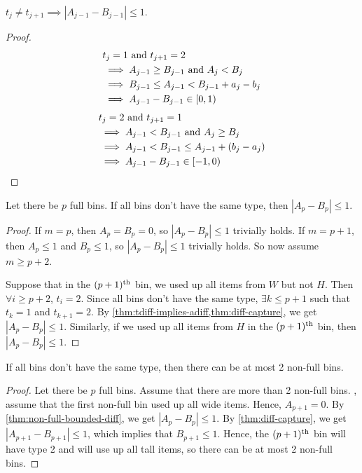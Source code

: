 \begin{lemma}
\label{thm:tdiff-implies-adiff}
$t_j \neq t_{j+1} \implies |A_{j-1} - B_{j-1}| \le 1$.
\end{lemma}
\begin{proof}
\begin{align*}
& t_j = 1 \textrm{ and } t_{j+1} = 2
\\ &\implies A_{j-1} \ge B_{j-1} \textrm{ and } A_j < B_j
\\ &\implies B_{j-1} \le A_{j-1} < B_{j-1} + a_j - b_j
\\ &\implies A_{j-1} - B_{j-1} \in [0, 1)
\end{align*}
\begin{align*}
& t_j = 2 \textrm{ and } t_{j+1} = 1
\\ &\implies A_{j-1} < B_{j-1} \textrm{ and } A_j \ge B_j
\\ &\implies A_{j-1} < B_{j-1} \le A_{j-1} + (b_j - a_j)
\\ &\implies A_{j-1} - B_{j-1} \in [-1, 0)
\qedhere \end{align*}
\end{proof}

\begin{lemma}
\label{thm:non-full-bounded-diff}
Let there be $p$ full bins. If all bins don't have the same type, then $|A_p - B_p| \le 1$.
\end{lemma}
\begin{proof}
If $m = p$, then $A_p = B_p = 0$, so $|A_p - B_p| \le 1$ trivially holds.
If $m = p+1$, then $A_p \le 1$ and $B_p \le 1$, so $|A_p - B_p| \le 1$ trivially holds.
So now assume $m \ge p+2$.

Suppose that in the $(p+1)^{\textrm{th}}$ bin, we used up all items from $W$ but not $H$.
Then $\forall i \ge p+2$, $t_i = 2$.
Since all bins don't have the same type, $\exists k \le p+1$ such that
$t_k = 1$ and $t_{k+1} = 2$.
By \cref{thm:tdiff-implies-adiff,thm:diff-capture}, we get $|A_p - B_p| \le 1$.
Similarly, if we used up all items from $H$ in the $(p+1)^{\textrm{th}}$ bin, then $|A_p - B_p| \le 1$.
\end{proof}

\begin{lemma}
\label{thm:non-full-ub}
If all bins don't have the same type, then there can be at most 2 non-full bins.
\end{lemma}
\begin{proof}
Let there be $p$ full bins. Assume that there are more than 2 non-full bins.
\WLoG, assume that the first non-full bin used up all wide items.
Hence, $A_{p+1} = 0$.
By \cref{thm:non-full-bounded-diff}, we get $|A_p - B_p| \le 1$.
By \cref{thm:diff-capture}, we get $|A_{p+1} - B_{p+1}| \le 1$,
which implies that $B_{p+1} \le 1$.
Hence, the $(p+1)^{\textrm{th}}$ bin will have type 2 and will use up all tall items,
so there can be at most 2 non-full bins.
\end{proof}

